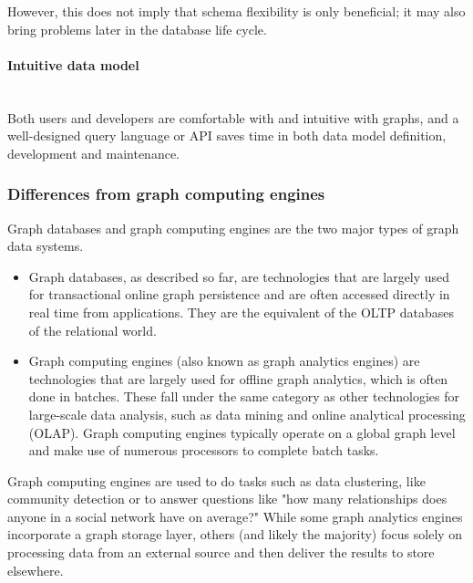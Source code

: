 However, this does not imply that schema flexibility is only beneficial; it may also bring problems later in the database life cycle.
\par
\paragraph{Intuitive data model}\mbox{}\\\indent
Both users and developers are comfortable with and intuitive with graphs, and a well-designed query language or \acrshort{API} saves time in both data model definition, development and maintenance.
\par
\subsubsection{Differences from graph computing engines} \label{subsubsection:LiteratureReview/ReviewofGraphDatabaseSystems/Graphdatabasecharacteristics/Differencesfromgraphcomputingengines}
Graph databases and graph computing engines are the two major types of graph data systems.
 \begin{itemize}[noitemsep]
	\item Graph databases, as described so far, are technologies that are largely used for transactional online graph persistence and are often accessed directly in real time from applications.
	They are the equivalent of the OLTP databases of the relational world.
	\item Graph computing engines (also known as graph analytics engines) are technologies that are largely used for offline graph analytics, which is often done in batches.
	These fall under the same category as other technologies for large-scale data analysis, such as data mining and online analytical processing (OLAP).
	Graph computing engines typically operate on a global graph level and make use of numerous processors to complete batch tasks.
\end{itemize}

Graph computing engines are used to do tasks such as data clustering, like community detection or to answer questions like "how many relationships does anyone in a social network have on average?"
While some graph analytics engines incorporate a graph storage layer, others (and likely the majority) focus solely on processing data from an external source and then deliver the results to store elsewhere.

